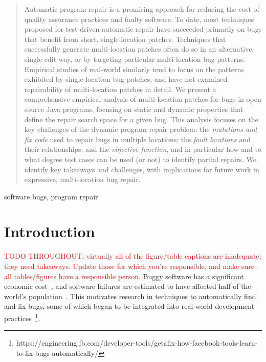 \documentclass[10pt, conference]{IEEEtran}
\newcommand\todo[1]{\textcolor{red}{#1}}
\begin{document}
\begin{abstract}
    Automatic program repair is a promising approach for reducing the
    cost of quality assurance practices and faulty software. To date, most
    techniques proposed for test-driven automatic repair have succeeded
    primarily on bugs that benefit from short, single-location patches. Techniques
    that successfully generate multi-location patches often do so in an
    alternative, single-edit way, or by targeting particular multi-location bug
    patterns. Empirical studies of real-world similarly tend to focus on the
    patterns exhibited by single-location bug patches, and have not examined repairability
    of multi-location patches in detail. We present a comprehensive empirical analysis
    of multi-location patches for bugs in open source Java programs, focusing on static and
    dynamic properties that define the repair search space for a given bug.
    This analysis focuses on the key challenges of the dynamic program repair
    problem: the \emph{mutations and fix code} used to repair bugs in multiple locations;
    the \emph{fault locations} and their relationships; and the \emph{objective
      function}, and in particular how and to what degree test cases can be used
    (or not) to identify partial repairs. We identify key takeaways and
    challenges, with implications for future work in expressive, multi-location bug
    repair.
\end{abstract}

\begin{IEEEkeywords}
  software bugs, program repair
\end{IEEEkeywords}

\newcommand{\rqorinsight}[2]{
  \setlength{\fboxsep}{0.8em}
  \vspace{0.5em}
  \begin{center}
  \Ovalbox{\begin{minipage}{0.9\linewidth}
    \textbf{RQ#1:} #2
    \end{minipage}}
  \end{center}
  \vspace{0.5em}}

\section{Introduction}


\todo{TODO THROUGHOUT: virtually all of the figure/table captions are
  inadequate; they need takeaways.  Update those for which you're responsible,
  and make sure all tables/figures have a responsible person.}
Buggy software has a significant economic cost~\cite{cambridge-study}, and
software failures are estimated to have affected half of the world's
population~\cite{tricentis}.  This motivates research in
techniques to automatically find and fix bugs, some of which
began to be integrated into
real-world development practices~\cite{iceland,sapfix}\footnote{https://engineering.fb.com/developer-tools/getafix-how-facebook-tools-learn-to-fix-bugs-automatically/}.
\end{document}
